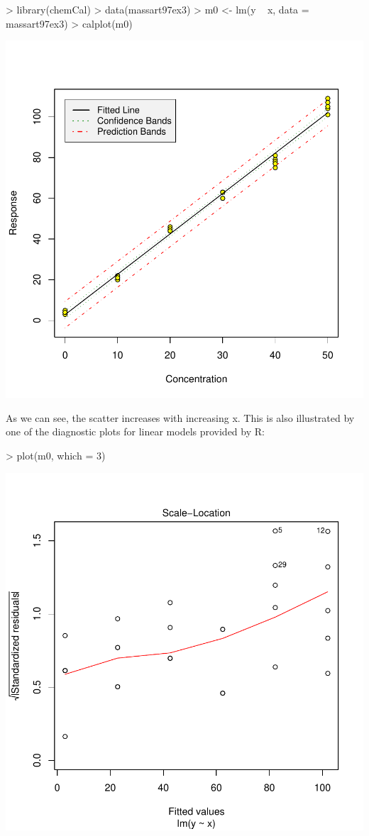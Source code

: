 \documentclass[a4paper]{article}
\begin{document}
\begin{Schunk}
\begin{Sinput}
> library(chemCal)
> data(massart97ex3)
> m0 <- lm(y ~ x, data = massart97ex3)
> calplot(m0)
\end{Sinput}
\end{Schunk}
\includegraphics{chemCal-001}

As we can see, the scatter increases with increasing x. This is also
illustrated by one of the diagnostic plots for linear models 
provided by R: 

\begin{Schunk}
\begin{Sinput}
> plot(m0, which = 3)
\end{Sinput}
\end{Schunk}
\includegraphics{chemCal-002}
\end{document}
